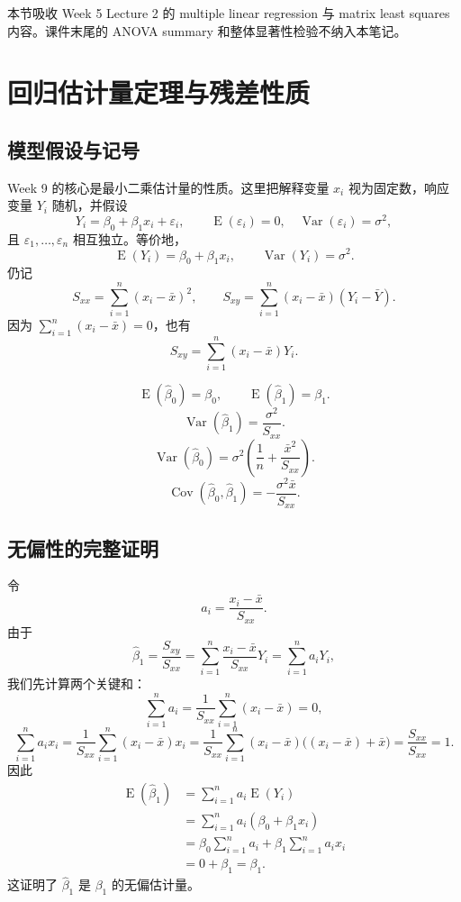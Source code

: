 \documentclass[11pt,a4paper]{article}
\theoremstyle{definition}
\theoremstyle{plain}
\theoremstyle{remark}
\newcommand{\E}{\operatorname{E}}
\newcommand{\Var}{\operatorname{Var}}
\newcommand{\Cov}{\operatorname{Cov}}
\begin{document}
\begin{sourcebox}
本节吸收 Week 5 Lecture 2 的 multiple linear regression 与 matrix least squares 内容。课件末尾的 ANOVA summary 和整体显著性检验不纳入本笔记。
\end{sourcebox}

\section{回归估计量定理与残差性质}
\label{sec:regression-estimator-theorems}

\subsection{模型假设与记号}

Week 9 的核心是最小二乘估计量的性质。这里把解释变量 $x_i$ 视为固定数，响应变量 $Y_i$ 随机，并假设
\[
    Y_i=\beta_0+\beta_1x_i+\varepsilon_i,\qquad
    \E(\varepsilon_i)=0,\quad
    \Var(\varepsilon_i)=\sigma^2,
\]
且 $\varepsilon_1,\ldots,\varepsilon_n$ 相互独立。等价地，
\[
    \E(Y_i)=\beta_0+\beta_1x_i,\qquad
    \Var(Y_i)=\sigma^2.
\]
仍记
\[
    S_{xx}=\sum_{i=1}^n(x_i-\bar x)^2,\qquad
    S_{xy}=\sum_{i=1}^n(x_i-\bar x)(Y_i-\bar Y).
\]
因为 $\sum_{i=1}^n(x_i-\bar x)=0$，也有
\[
    S_{xy}=\sum_{i=1}^n(x_i-\bar x)Y_i.
\]

\begin{memorybox}
\[
    \boxed{\E(\hat\beta_0)=\beta_0,\qquad \E(\hat\beta_1)=\beta_1.}
\]
\[
    \boxed{\Var(\hat\beta_1)=\frac{\sigma^2}{S_{xx}}.}
\]
\[
    \boxed{\Var(\hat\beta_0)=\sigma^2\left(\frac{1}{n}+\frac{\bar x^2}{S_{xx}}\right).}
\]
\[
    \boxed{\Cov(\hat\beta_0,\hat\beta_1)=-\frac{\sigma^2\bar x}{S_{xx}}.}
\]
\end{memorybox}

\subsection{无偏性的完整证明}

令
\[
    a_i=\frac{x_i-\bar x}{S_{xx}}.
\]
由于
\[
    \hat\beta_1=\frac{S_{xy}}{S_{xx}}
    =
    \sum_{i=1}^n \frac{x_i-\bar x}{S_{xx}}Y_i
    =
    \sum_{i=1}^n a_iY_i,
\]
我们先计算两个关键和：
\[
    \sum_{i=1}^n a_i
    =
    \frac{1}{S_{xx}}\sum_{i=1}^n(x_i-\bar x)=0,
\]
\[
    \sum_{i=1}^n a_ix_i
    =
    \frac{1}{S_{xx}}\sum_{i=1}^n(x_i-\bar x)x_i
    =
    \frac{1}{S_{xx}}\sum_{i=1}^n(x_i-\bar x)\bigl((x_i-\bar x)+\bar x\bigr)
    =
    \frac{S_{xx}}{S_{xx}}=1.
\]
因此
\begin{align}
    \E(\hat\beta_1)
    &=
    \sum_{i=1}^n a_i\E(Y_i)\\
    &=
    \sum_{i=1}^n a_i(\beta_0+\beta_1x_i)\\
    &=
    \beta_0\sum_{i=1}^n a_i+\beta_1\sum_{i=1}^n a_ix_i\\
    &=
    0+\beta_1=\beta_1.
\end{align}
这证明了 $\hat\beta_1$ 是 $\beta_1$ 的无偏估计量。
\end{document}

